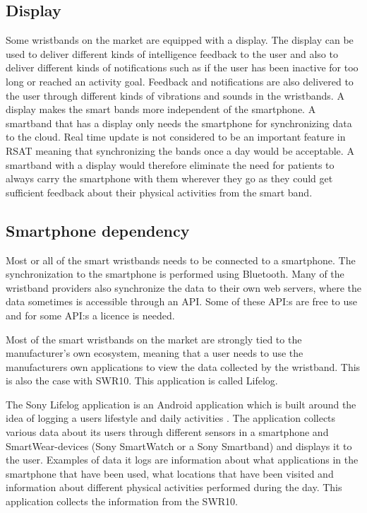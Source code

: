 \documentclass{cslthse-msc}
\begin{document}
\subsection{Display}
\label{sec:display}
Some wristbands on the market are equipped with a display. The display can be used to deliver different kinds of intelligence feedback to the user and also to deliver different kinds of notifications such as if the user has been inactive for too long or reached an activity goal.  Feedback and notifications are also delivered to the user through different kinds of vibrations and sounds in the wristbands. A display makes the smart bands more independent of the smartphone. A smartband that has a display only needs the smartphone for synchronizing data to the cloud. Real time update is not considered to be an important feature in RSAT meaning that synchronizing the bands once a day would be acceptable. A smartband with a display would therefore eliminate the need for patients to always carry the smartphone with them wherever they go as they could get sufficient feedback about their physical activities from the smart band. 

\subsection{Smartphone dependency}
Most or all of the smart wristbands needs to be connected to a smartphone. The synchronization to the smartphone is performed using Bluetooth. Many of the wristband providers also synchronize the data to their own web servers, where the data sometimes is accessible through an API. Some of these API:s are free to use and for some API:s a licence is needed.

Most of the smart wristbands on the market are strongly tied to the manufacturer’s own ecosystem, meaning that a user needs to use the manufacturers own applications to view the data collected by the wristband. This is also the case with SWR10. This application is called Lifelog. 

The Sony Lifelog application is an Android application which is built around the idea of logging a users lifestyle and daily activities \cite{LifeLogDescr}. The application collects various data about its users through different sensors in a smartphone and SmartWear-devices (Sony SmartWatch or a Sony Smartband) and displays it to the user. Examples of data it logs are information about what applications in the smartphone that have been used, what locations that have been visited and information about different physical activities performed during the day. This application collects the information from the SWR10.
\end{document}
